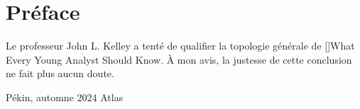 \chapter{Préface}

Le professeur John L. Kelley a tenté de qualifier la topologie générale de [\cite{kel75}]{What Every Young Analyst Should Know}. À mon avis, la justesse de cette conclusion ne fait plus aucun doute.

\begin{flushright}
    Pékin, automne 2024 \hfill Atlas
\end{flushright}
